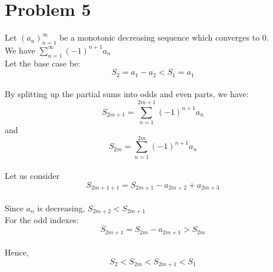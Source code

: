 \documentclass{article}
\begin{document}
\section*{Problem 5}
Let $(a_n)_{n=1}^{\infty}$ be a monotonic decreasing sequence which converges to 0.
\\We have $\sum_{n=1}^{\infty} (-1)^{n+1}a_n$
\\Let the base case be: $$S_2 = a_1 - a_2 < S_1 = a_1$$
\\By splitting up the partial sums into odds and even parts, we have: $$S_{2m+1} = \sum_{n=1}^{2m+1} (-1)^{n+1}a_n$$ and $$S_{2m} = \sum_{n=1}^{2m} (-1)^{n+1} a_n$$
\\Let us consider $$S_{2m+1 + 1} = S_{2m+1} - a_{2m+2} + a_{2m+3}$$
\\Since $a_n$ is decreasing, $S_{2m+2} < S_{2m+1}$
\\For the odd indexes: $$S_{2m + 1} = S_{2m} - a_{2m + 1} > S_{2m}$$
\\Hence, $$S_2 < S_{2m} < S_{2m+1} < S_1$$
\end{document}
